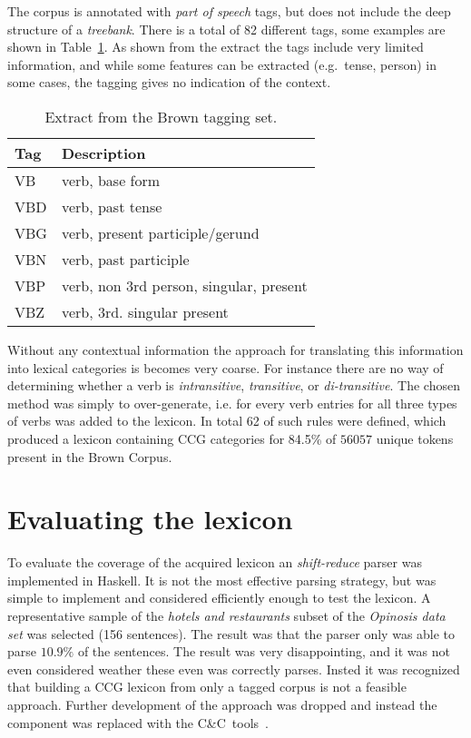 The corpus is annotated with \emph{part of speech} tags, but does not include the deep structure of a \emph{treebank}. There is a total of 82 different tags, some examples are shown in Table~\ref{tab:brownTags}. As shown from the extract the tags include very limited information, and while some features can be extracted (e.g.\ tense, person) in some cases, the tagging gives no indication of the context.
\begin{table}[ht]
\begin{center}
\begin{tabular}{ll}
  Tag & Description \\ \hline \hline
  VB  & verb, base form \\ \hline
  VBD & verb, past tense \\ \hline
  VBG & verb, present participle/gerund \\ \hline
  VBN & verb, past participle \\ \hline
  VBP & verb, non 3rd person, singular, present \\ \hline
  VBZ & verb, 3rd. singular present 
\end{tabular}
\end{center}
\caption{Extract from the Brown tagging set.}
\label{tab:brownTags}
\end{table}

Without any contextual information the approach for translating this information into lexical categories is becomes very coarse. For instance there are no way of determining whether a verb is \emph{intransitive}, \emph{transitive}, or \emph{di-transitive}. The chosen method was simply to over-generate, i.e. for every verb entries for all three types of verbs was added to the lexicon. In total 62 of such rules were defined, which produced a lexicon containing CCG categories for 84.5\% of $\num{56057}$ unique tokens present in the Brown Corpus.

\section*{Evaluating the lexicon}
To evaluate the coverage of the acquired lexicon an \emph{shift-reduce} parser was implemented in Haskell. It is not the most effective parsing strategy, but was simple to implement and considered efficiently enough to test the lexicon. A representative sample of the \emph{hotels and restaurants} subset of the \emph{Opinosis data set} was selected (156 sentences). The result was that the parser only was able to parse $10.9\%$ of the sentences. The result was very disappointing, and it was not even considered weather these even was correctly parses. Insted it was recognized that building a CCG lexicon from only a tagged corpus is not a feasible approach. Further development of the approach was dropped and instead the component was replaced with the C\&C~tools~\cite{candc}.



